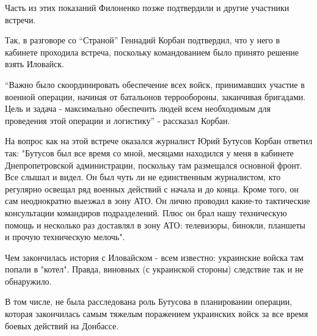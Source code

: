 Часть из этих показаний Филоненко позже подтвердили и другие участники
встречи.

Так, в разговоре со \enquote{Страной} Геннадий Корбан подтвердил, что у него в
кабинете проходила встреча, поскольку командованием было принято решение
взять Иловайск.

\enquote{Важно было скоординировать обеспечение всех войск, принимавших участие в
военной операции, начиная от батальонов террообороны, заканчивая
бригадами. Цель и задача - максимально обеспечить людей всем необходимым
для проведения этой операции и логистику} - рассказал Корбан.

На вопрос как на этой встрече оказался журналист Юрий Бутусов Корбан
ответил так: "Бутусов был все время со мной, месяцами находился у меня в
кабинете Днепропетровской администрации, поскольку там размещался основной
фронт. Все слышал и видел. Он был чуть ли не единственным журналистом, кто
регулярно освещал ряд военных действий с начала и до конца. Кроме того, он
сам неоднократно выезжал в зону АТО. Он лично проводил какие-то
тактические консультации командиров подразделений. Плюс он брал нашу
техническую помощь и несколько раз доставлял в зону АТО: телевизоры,
бинокли, планшеты и прочую техническую мелочь".

Чем закончилась история с Иловайском - всем известно: украинские войска
там попали в "котел". Правда, виновных (с украинской стороны) следствие
так и не обнаружило.

В том числе, не была расследована роль Бутусова в планировании операции,
которая закончилась самым тяжелым поражением украинских войск за все время
боевых действий на Донбассе.

